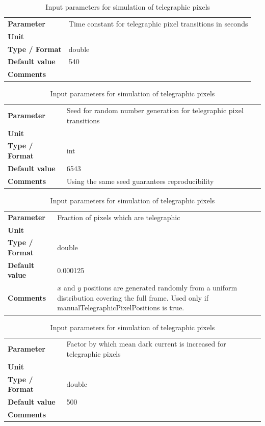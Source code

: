 \documentclass[11pt]{article}      %
\def\HCode#1{}
\def\htmlanchor#1{\HCode{<a id="#1"></a>}}
\begin{document}
\begin{table}[hb]
  \caption{Input parameters for simulation of telegraphic pixels}

  \htmlanchor{telegraphicTimeConstant}
  \begin{tabular}{| l | p{13cm} |}
    \hline 
    {\bf Parameter} & Time constant for telegraphic pixel transitions in seconds\\
    {\bf Unit} & \\
    {\bf Type / Format} & double\\
    {\bf Default value} & 540\\
    {\bf Comments} & \\
    \hline
  \end{tabular}
  \bigskip

  \htmlanchor{telegraphicTransitionSeed}
  \begin{tabular}{| l | p{13cm} |}
    \hline 
    {\bf Parameter} & Seed for random number generation for telegraphic pixel transitions\\
    {\bf Unit} & \\
    {\bf Type / Format} & int\\
    {\bf Default value} & 6543\\
    {\bf Comments} & Using the same seed guarantees reproducibility\\
    \hline
  \end{tabular}
  \bigskip

  \htmlanchor{fracTelegraphicPixels}
  \begin{tabular}{| l | p{13cm} |}
    \hline 
    {\bf Parameter} & Fraction of pixels which are telegraphic\\
    {\bf Unit} & \\
    {\bf Type / Format} & double\\
    {\bf Default value} & 0.000125\\
    {\bf Comments} & $x$ and $y$ positions are generated randomly from a uniform distribution covering the full frame. Used only if manualTelegraphicPixelPositions is true.\\
    \hline
  \end{tabular}
  \bigskip 

  \htmlanchor{telegraphicPixelRelativeDarkCurrent}
  \begin{tabular}{| l | p{13cm} |}
    \hline 
    {\bf Parameter} & Factor by which mean dark current is increased for telegraphic pixels\\
    {\bf Unit} & \\
    {\bf Type / Format} & double\\
    {\bf Default value} & 500\\
    {\bf Comments} &\\
    \hline
  \end{tabular}
  \bigskip 

  \label{tab:telegraphic}
\end{table}
\end{document}
